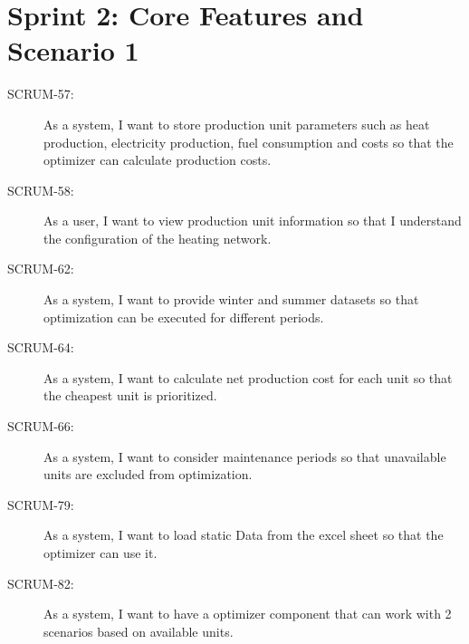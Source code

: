 \section*{Sprint 2: Core Features and Scenario 1}
\begin{description}
    \item[SCRUM-57:] As a system, I want to store production unit parameters such as heat production, electricity production, fuel consumption and costs so that the optimizer can calculate production costs.
    \item[SCRUM-58:] As a user, I want to view production unit information so that I understand the configuration of the heating network.
    \item[SCRUM-62:] As a system, I want to provide winter and summer datasets so that optimization can be executed for different periods.
    \item[SCRUM-64:] As a system, I want to calculate net production cost for each unit so that the cheapest unit is prioritized.
    \item[SCRUM-66:] As a system, I want to consider maintenance periods so that unavailable units are excluded from optimization.
    \item[SCRUM-79:] As a system, I want to load static Data from the excel sheet so that the optimizer can use it.
    \item[SCRUM-82:] As a system, I want to have a optimizer component that can work with 2 scenarios based on available units.
\end{description}


